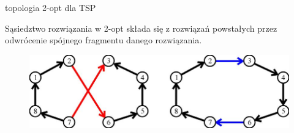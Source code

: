 \documentclass[blue]{beamer}
\begin{document}
\begin{frame}{topologia 2-opt dla TSP}
\begin{block}{Sąsiedztwo rozwiązania w 2-opt}
składa się z rozwiązań
powstałych przez odwrócenie spójnego
fragmentu danego rozwiązania.
\end{block}
\begin{figure}
\includegraphics[scale=.7]{2opt.jpg}
\end{figure}
\end{frame}




\end{document}
